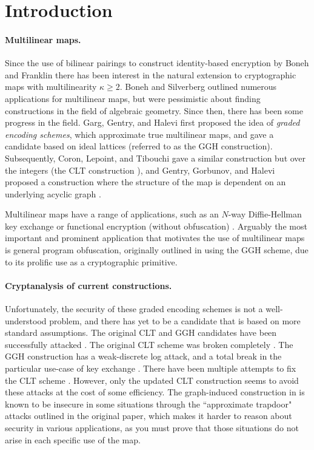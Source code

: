 \section{Introduction}

\paragraph{Multilinear maps.} Since the use of bilinear pairings to construct identity-based encryption by Boneh and Franklin \cite{bf} there has been interest in the natural extension to cryptographic maps with multilinearity $\kappa \geq 2$.  Boneh and Silverberg \cite{bs} outlined numerous applications for multilinear maps, but were pessimistic about finding constructions in the field of algebraic geometry.  Since then, there has been some progress in the field.  Garg, Gentry, and Halevi \cite{ggh13a} first proposed the idea of \textit{graded encoding schemes}, which approximate true multilinear maps, and gave a candidate based on ideal lattices (referred to as the GGH construction).  Subsequently, Coron, Lepoint, and Tibouchi gave a similar construction but over the integers (the CLT construction \cite{clt, clt15}), and Gentry, Gorbunov, and Halevi proposed a construction where the structure of the map is dependent on an underlying acyclic graph \cite{ggh14a}.

Multilinear maps have a range of applications, such as an $N$-way Diffie-Hellman key exchange \cite{bs} or functional encryption (without obfuscation) \cite{blr}.  Arguably the most important and prominent application that motivates the use of multilinear maps is general program obfuscation, originally outlined in \cite{ggh13b} using the GGH scheme, due to its prolific use as a cryptographic primitive.

\paragraph{Cryptanalysis of current constructions.}  Unfortunately, the security of these graded encoding schemes is not a well-understood problem, and there has yet to be a candidate that is based on more standard assumptions.  The original CLT and GGH candidates have been successfully attacked \cite{chl, cgh, hj}.  The original CLT scheme was broken completely \cite{chl, cgh}.  The GGH construction has a weak-discrete log attack, and a total break in the particular use-case of key exchange \cite{cgh, hj}.  There have been multiple attempts to fix the CLT scheme \cite{bwz, clt14, clt15}.  However, only the updated CLT construction \cite{clt15} seems to avoid these attacks at the cost of some efficiency.  The graph-induced construction in \cite{ggh14a} is known to be insecure in some situations through the ``approximate trapdoor" attacks outlined in the original paper, which makes it harder to reason about security in various applications, as you must prove that those situations do not arise in each specific use of the map.

